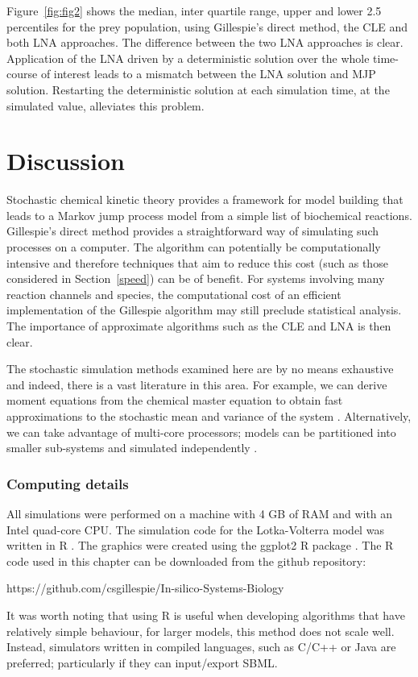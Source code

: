 \documentclass[12pt, DIV12]{scrartcl}
\begin{document}
Figure~\ref{fig:fig2} shows the median, inter quartile range, upper and lower
2.5 percentiles for the prey population, using Gillespie's direct method, the
CLE and both LNA approaches. The difference between the two LNA approaches is
clear. Application of the LNA driven by a deterministic solution over the whole
time-course of interest leads to a mismatch between the LNA solution and MJP
solution. Restarting the deterministic solution at each simulation time, at the
simulated value, alleviates this problem.

\section{Discussion}\label{sec:disc}

Stochastic chemical kinetic theory provides a framework for model building that
leads to a Markov jump process model from a simple list of biochemical
reactions. Gillespie's direct method provides a straightforward way of
simulating such processes on a computer. The algorithm can potentially be
computationally intensive and therefore techniques that aim to reduce this cost
(such as those considered in Section~\ref{speed}) can be of benefit. For systems
involving many reaction channels and species, the computational cost of an
efficient implementation of the Gillespie algorithm may still preclude
statistical analysis. The importance of approximate algorithms such as the CLE
and LNA is then clear.

The stochastic simulation methods examined here are by no means exhaustive and
indeed, there is a vast literature in this area. For example, we can derive
moment equations from the chemical master equation to obtain fast approximations
to the stochastic mean and variance of the system \cite{Gillespie2009a,
  Gomez-Uribe2007,krishnarajah:05}. Alternatively, we can take advantage of
multi-core processors; models can be partitioned into smaller sub-systems and
simulated independently \cite{Gillespie2012}.


\subsubsection*{Computing details} 

All simulations were performed on a machine with 4 GB of RAM and with an Intel
quad-core CPU. The simulation code for the Lotka-Volterra model was written in R
\cite{R}. The graphics were created using the ggplot2 R package \cite{ggplot2}.
The R code used in this chapter can be downloaded from the github repository:
\begin{center}
https://github.com/csgillespie/In-silico-Systems-Biology
\end{center}
It was worth noting that using R is useful when developing algorithms that have
relatively simple behaviour, for larger models, this method does not scale well.
Instead, simulators written in compiled languages, such as C/C++ or Java are
preferred; particularly if they can input/export SBML.



\end{document}
